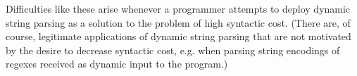 \begin{enumerate}


\end{enumerate}

Difficulties like these arise whenever a programmer attempts to deploy dynamic string parsing as a solution to the problem of high syntactic cost. %
(There are, of course, legitimate applications of dynamic string parsing that are not motivated by the desire to decrease syntactic cost, e.g. when parsing string encodings of regexes received as dynamic input to the program.)%

